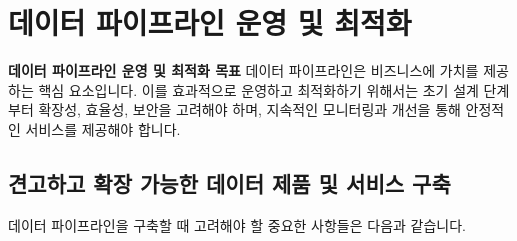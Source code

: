 \documentclass[11pt,a4paper]{article}
\theoremstyle{definition}
\begin{document}
\newpage
\section{데이터 파이프라인 운영 및 최적화}

\begin{tcolorbox}[conceptbox] %
\textbf{데이터 파이프라인 운영 및 최적화 목표}
데이터 파이프라인은 비즈니스에 가치를 제공하는 핵심 요소입니다. 이를 효과적으로 운영하고 최적화하기 위해서는 초기 설계 단계부터 확장성, 효율성, 보안을 고려해야 하며, 지속적인 모니터링과 개선을 통해 안정적인 서비스를 제공해야 합니다.
\end{tcolorbox}

\subsection{견고하고 확장 가능한 데이터 제품 및 서비스 구축}
데이터 파이프라인을 구축할 때 고려해야 할 중요한 사항들은 다음과 같습니다.
\end{document}
